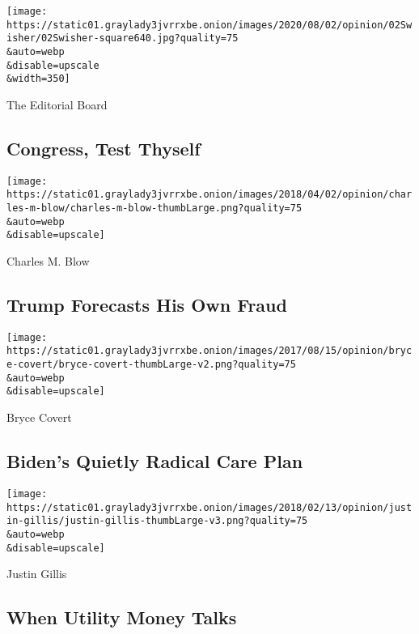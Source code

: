 \texttt{[image: https://static01.graylady3jvrrxbe.onion/images/2020/08/02/opinion/02Swisher/02Swisher-square640.jpg?quality=75\\\&auto=webp\\\&disable=upscale\\\&width=350]}

\href{/2020/08/02/opinion/coronavirus-gohmert-congress-testing.html}{}

The Editorial Board

\hypertarget{congress-test-thyself}{%
\subsection{Congress, Test Thyself}\label{congress-test-thyself}}

\href{/2020/08/02/opinion/trump-2020-election.html}{}

\texttt{[image: https://static01.graylady3jvrrxbe.onion/images/2018/04/02/opinion/charles-m-blow/charles-m-blow-thumbLarge.png?quality=75\\\&auto=webp\\\&disable=upscale]}

Charles M. Blow

\hypertarget{trump-forecasts-his-own-fraud}{%
\subsection{Trump Forecasts His Own
Fraud}\label{trump-forecasts-his-own-fraud}}

\href{/2020/08/02/opinion/biden-child-care.html}{}

\texttt{[image: https://static01.graylady3jvrrxbe.onion/images/2017/08/15/opinion/bryce-covert/bryce-covert-thumbLarge-v2.png?quality=75\\\&auto=webp\\\&disable=upscale]}

Bryce Covert

\hypertarget{bidens-quietly-radical-care-plan}{%
\subsection{Biden's Quietly Radical Care
Plan}\label{bidens-quietly-radical-care-plan}}

\href{/2020/08/02/opinion/utility-corruption-energy.html}{}

\texttt{[image: https://static01.graylady3jvrrxbe.onion/images/2018/02/13/opinion/justin-gillis/justin-gillis-thumbLarge-v3.png?quality=75\\\&auto=webp\\\&disable=upscale]}

Justin Gillis

\hypertarget{when-utility-money-talks}{%
\subsection{When Utility Money Talks}\label{when-utility-money-talks}}

